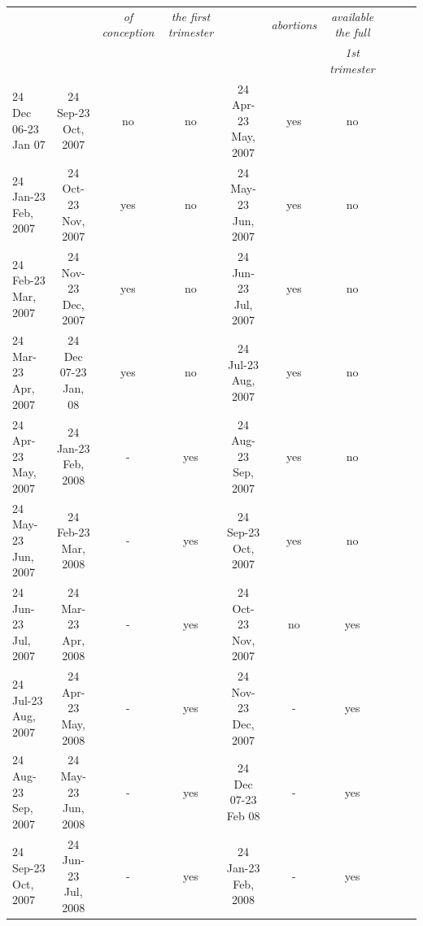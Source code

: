 \documentclass[a4paper, 11pt]{article}
\begin{document}
\begin{spacing}{1.4}
\begin{table}
\begin{threeparttable}
{\begin{tabular}{lccccccccc}
	 &  &\textit{of conception}&\textit{the first trimester} & &\textit{abortions}&\textit{available the full}\\
		&  & & &  & &\textit{1st trimester}\\
		\hline 
 

24 Dec 06-23 Jan 07	&	24 Sep-23 Oct, 2007	&	no	&	no	&	24 Apr-23 May, 2007	&	yes 	&	no	\\
24 Jan-23 Feb, 2007	&	24 Oct-23 Nov, 2007	&	yes	&	no	&	24 May-23 Jun, 2007	&	yes 	&	no	\\
24 Feb-23 Mar, 2007	&	24 Nov-23 Dec, 2007	&	yes	&	no	&	24 Jun-23 Jul, 2007	&	yes 	&	no	\\
24 Mar-23 Apr, 2007	&	24 Dec 07-23 Jan, 08	&	yes	&	no	&	24 Jul-23 Aug, 2007	&	yes 	&	no	\\
24 Apr-23 May, 2007	&	24 Jan-23 Feb, 2008	&	-	&	yes	&	24 Aug-23 Sep, 2007	&	yes 	&	no	\\
24 May-23 Jun, 2007	&	24 Feb-23 Mar, 2008	&	-	&	yes	&	24 Sep-23 Oct, 2007	&	yes 	&	no	\\
24 Jun-23 Jul, 2007	&	24 Mar-23 Apr, 2008	&	-	&	yes	&	24 Oct-23 Nov, 2007	&	no	&	yes	\\
24 Jul-23 Aug, 2007	&	24 Apr-23 May, 2008	&	-	&	yes	&	24 Nov-23 Dec, 2007	&	-	&	yes	\\
24 Aug-23 Sep, 2007	&	24 May-23 Jun, 2008	&	-	&	yes	&	24 Dec 07-23 Feb 08	&	-	&	yes	\\
24 Sep-23 Oct, 2007	&	24 Jun-23 Jul, 2008	&	-	&	yes	&	24 Jan-23 Feb, 2008	&	-	&	yes	\\


\hline 	\hline 


 \end{tabular} }

  		\begin{tablenotes}

  			\small


\end{tablenotes}
\end{threeparttable}
\end{table}
\end{spacing}
\end{document}
